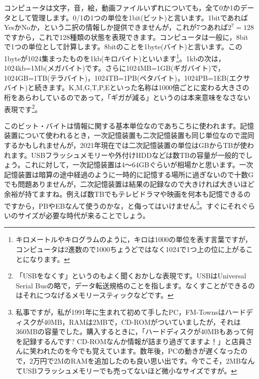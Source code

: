 \documentclass{ltjsbook}
\begin{document}
コンピュータは文字，音，絵，動画ファイルいずれについても，全て0か1のデータとして管理します。0/1の1つの単位を1bit(ビット)と言います。1bitであればYesかNoか，という二択の情報しか提供できませんが，これが7つあれば$2^7=128$ですから，これで128種類の状態を表現できます。コンピュータは一般に，8bitで1つの単位として計算します。8bitのことを1byte(バイト)と言います。この1byteが1024集まったものを1kb(キロバイト)といいます\footnote{キロメートルやキログラムのように，キロは1000の単位を表す言葉ですが，コンピュータは2進数ので1000ちょうどではなく1024で1つ上の位に上がることになります。}。1kbの次は，1024kb=1Mb(メガバイト)です。さらに1024MB=1GB(ギガバイト)で，1024GB=1TB(テラバイト)，1024TB=1PB(ペタバイト)，1024PB=1EB(エクサバイト)と続きます。K,M,G,T,P,Eといった名称は1000倍ごとに変わる大きさの桁をあらわしているのであって，「ギガが減る」というのは本来意味をなさない表現です\footnote{「USBをなくす」というのもよく聞くおかしな表現です。USBはUniversal Serial Busの略で，データ転送規格のことを指します。なくすことができるのはそれにつなげるメモリースティックなどです。}。

このビット・バイトは情報に関する基本単位なのであちこちに使われます。記憶装置について使われるとき，一次記憶装置も二次記憶装置も同じ単位なので混同するかもしれませんが，2021年現在では二次記憶装置の単位はGBからTBが使われます。USBフラッシュメモリーや外付けHDDなどは数TBの容量が一般的でしょう。これに対して，一次記憶装置は4〜64GBぐらいが相場かと思います。一次記憶装置は暗算の途中経過のように一時的に記憶する場所に過ぎないので十数Gでも問題ありませんが，二次記憶装置は結果の記録なので大きければ大きいほど余裕が持てますね。例えば数TBでもテレビドラマや映画を何本も記憶できるのですから，PBやEBなんて使うのかな，と侮ってはいけません\footnote{私事ですが，私が1991年に生まれて初めて手したPC，FM-Townsはハードディスクが40MB，RAMは2MBで，CD-ROMがついていましたが，それは360MBの容量でした。購入するときに，「ハードディスクが40MBもあって何を記録するんです? CD-ROMなんか情報が詰まり過ぎてますよ！」と店員さんに笑われたのを今でも覚えています。数年後，PCの動きが遅くなったので，2万円で2MのRAMを追加したのも良い思い出です。今でこそ，2MBなんてUSBフラッシュメモリーでも売ってないほど微小なサイズですが。}。すぐにそれぐらいのサイズが必要な時代が来ることでしょう。
\end{document}
